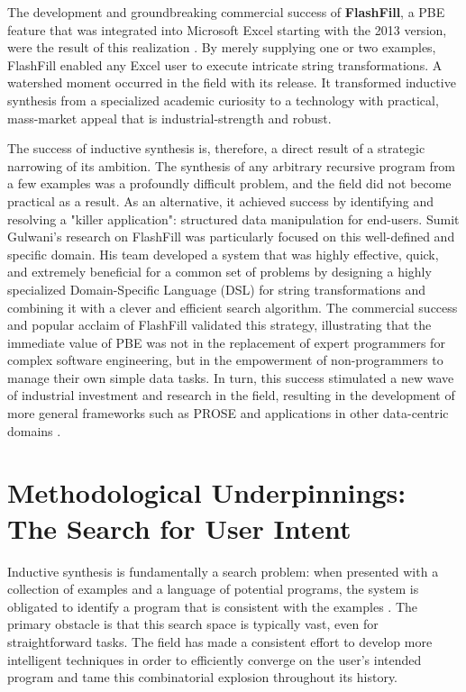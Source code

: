 \documentclass[12pt, a4paper]{report}
\begin{document}
The development and groundbreaking commercial success of \textbf{FlashFill}, a PBE feature that was integrated into Microsoft Excel starting with the 2013 version, were the result of this realization \citep{gulwani2011automating}.  By merely supplying one or two examples, FlashFill enabled any Excel user to execute intricate string transformations.  A watershed moment occurred in the field with its release.  It transformed inductive synthesis from a specialized academic curiosity to a technology with practical, mass-market appeal that is industrial-strength and robust.

The success of inductive synthesis is, therefore, a direct result of a strategic narrowing of its ambition.  The synthesis of any arbitrary recursive program from a few examples was a profoundly difficult problem, and the field did not become practical as a result.  As an alternative, it achieved success by identifying and resolving a "killer application": structured data manipulation for end-users.  Sumit Gulwani's research on FlashFill was particularly focused on this well-defined and specific domain.  His team developed a system that was highly effective, quick, and extremely beneficial for a common set of problems by designing a highly specialized Domain-Specific Language (DSL) for string transformations and combining it with a clever and efficient search algorithm.  The commercial success and popular acclaim of FlashFill validated this strategy, illustrating that the immediate value of PBE was not in the replacement of expert programmers for complex software engineering, but in the empowerment of non-programmers to manage their own simple data tasks.  In turn, this success stimulated a new wave of industrial investment and research in the field, resulting in the development of more general frameworks such as PROSE and applications in other data-centric domains \citep{polozov2015flashmeta}.

\section{Methodological Underpinnings: The Search for User Intent}

Inductive synthesis is fundamentally a search problem: when presented with a collection of examples and a language of potential programs, the system is obligated to identify a program that is consistent with the examples \citep{summers1977methodology}.  The primary obstacle is that this search space is typically vast, even for straightforward tasks.  The field has made a consistent effort to develop more intelligent techniques in order to efficiently converge on the user's intended program and tame this combinatorial explosion throughout its history.
\end{document}
